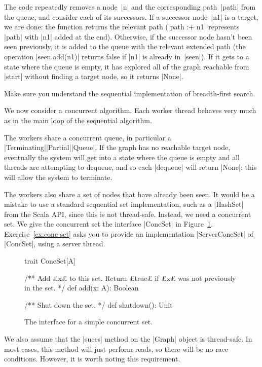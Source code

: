 The code repeatedly removes a node~|n| and the corresponding path~|path| from
the queue, and consider each of its successors.  If a successor node~|n1| is a
target, we are done: the function returns the relevant path (|path :+ n1|
represents |path| with |n1| added at the end).  Otherwise, if the successor
node hasn't been seen previously, it is added to the queue with the relevant
extended path (the operation |seen.add(n1)| returns false if |n1| is already
in~|seen|).  If it gets to a state where the queue is empty, it has explored
all of the graph reachable from |start| without finding a target node, so it
returns |None|.

\begin{instruction}
Make sure you understand the sequential implementation of breadth-first search.
\end{instruction}


We now consider a concurrent algorithm.  Each worker thread behaves very much
as in the main loop of the sequential algorithm.

The workers share a concurrent queue, in particular a
|Terminating|\-|Partial|\-|Queue|.  If the graph has no reachable
target node, eventually the system will get into a state where the queue is
empty and all threads are attempting to dequeue, and so each |dequeue| will
return |None|: this will allow the system to terminate.

The workers also share a set of nodes that have already been seen.  It would
be a mistake to use a standard sequential set implementation, such as a
|HashSet| from the Scala API, since this is not thread-safe.  Instead, we need
a concurrent set.  We give the concurrent set the interface |ConcSet| in
Figure~\ref{fig:ConcSet}.  Exercise~\ref{ex:conc-set} asks you to provide an
implementation |ServerConcSet| of |ConcSet|, using a server thread.

\begin{figure}
\begin{scala}
trait ConcSet[A]{
  /** Add £x£ to this set.  Return £true£ if £x£ was not previously in the set. */
  def add(x: A): Boolean

  /** Shut down the set. */
  def shutdown(): Unit
}
\end{scala}
\caption{The interface for a simple concurrent set.}
\label{fig:ConcSet}
\end{figure}

We also assume that the |succs| method on the |Graph| object is thread-safe.
In most cases, this method will just perform reads, so there will be no race
conditions.  However, it is worth noting this requirement. 

